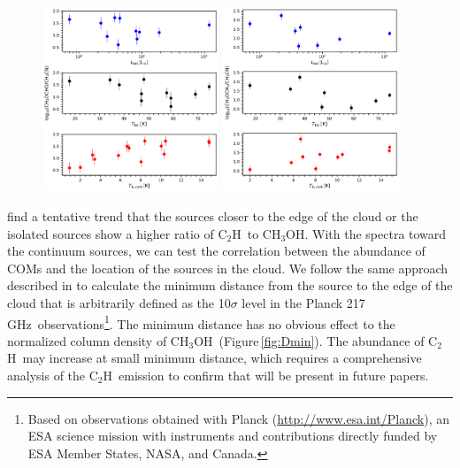\documentclass[twocolumn]{aastex62}
\newcommand{\ghz}{\mbox{\,GHz}}
\newcommand{\methanol}{\mbox{CH$_{3}$OH}}
\newcommand{\cch}{\mbox{C$_2$H}}
\begin{document}
\renewcommand{\thefigure}{\arabic{figure} (Cont.)}
\addtocounter{figure}{-1}
\begin{figure}[htbp!]
  \centering
  \includegraphics[width=0.47\textwidth]{ratio_ch3ocho_ch3cn.pdf}
  \includegraphics[width=0.47\textwidth]{ratio_ch3och3_ch3cn.pdf}
  \caption{}
\end{figure}
\renewcommand{\thefigure}{\arabic{figure}}

\citet{2018ApJS..236...52H} find a tentative trend that the sources closer to the edge of the cloud or the isolated sources show a higher ratio of \cch\ to \methanol.  With the spectra toward the continuum sources, we can test the correlation between the abundance of COMs and the location of the sources in the cloud.  We follow the same approach described in \citet{2018ApJS..236...52H} to calculate the minimum distance from the source to the edge of the cloud that is arbitrarily defined as the 10$\sigma$ level in the Planck 217\ghz\ observations\footnote{Based on observations obtained with Planck (\href{http://www.esa.int/Planck}{http://www.esa.int/Planck}), an ESA science mission with instruments and contributions directly funded by ESA Member States, NASA, and Canada.}.  The minimum distance has no obvious effect to the normalized column density of \methanol\ (Figure\,\ref{fig:Dmin}).  The abundance of \cch\ may increase at small minimum distance, which requires a comprehensive analysis of the \cch\ emission to confirm that will be present in future papers.
\end{document}
